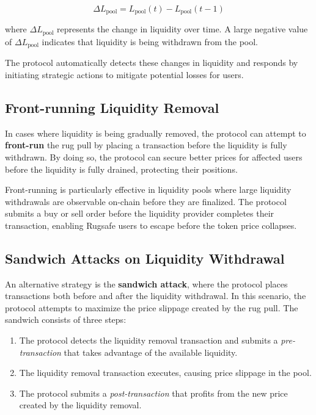 \documentclass{article}
\begin{document}
\[
\Delta L_{\text{pool}} = L_{\text{pool}}(t) - L_{\text{pool}}(t-1)
\]

where \( \Delta L_{\text{pool}} \) represents the change in liquidity over time. A large negative value of \( \Delta L_{\text{pool}} \) indicates that liquidity is being withdrawn from the pool.

The protocol automatically detects these changes in liquidity and responds by initiating strategic actions to mitigate potential losses for users.

\subsection{Front-running Liquidity Removal}

In cases where liquidity is being gradually removed, the protocol can attempt to \textbf{front-run} the rug pull by placing a transaction before the liquidity is fully withdrawn. By doing so, the protocol can secure better prices for affected users before the liquidity is fully drained, protecting their positions.

Front-running is particularly effective in liquidity pools where large liquidity withdrawals are observable on-chain before they are finalized. The protocol submits a buy or sell order before the liquidity provider completes their transaction, enabling Rugsafe users to escape before the token price collapses.

\subsection{Sandwich Attacks on Liquidity Withdrawal}

An alternative strategy is the \textbf{sandwich attack}, where the protocol places transactions both before and after the liquidity withdrawal. In this scenario, the protocol attempts to maximize the price slippage created by the rug pull. The sandwich consists of three steps:

\begin{enumerate}
    \item The protocol detects the liquidity removal transaction and submits a \textit{pre-transaction} that takes advantage of the available liquidity.
    \item The liquidity removal transaction executes, causing price slippage in the pool.
    \item The protocol submits a \textit{post-transaction} that profits from the new price created by the liquidity removal.
\end{enumerate}
\end{document}
